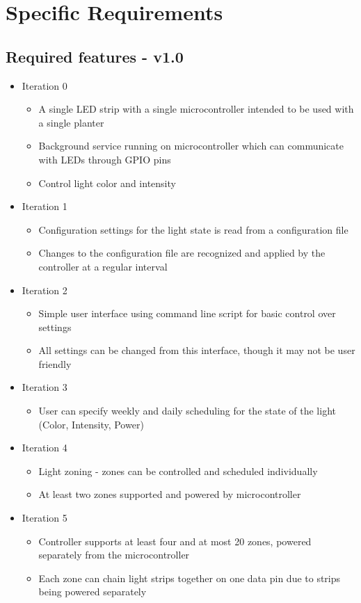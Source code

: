	\section{Specific Requirements}
		\subsection{Required features - v1.0}
			\begin{itemize}
				\item Iteration 0
						\begin{itemize}
						\item A single LED strip with a single microcontroller intended to be used with a single planter
						\item Background service running on microcontroller which can communicate with LEDs through GPIO pins
						\item Control light color and intensity
					\end{itemize}
						\item Iteration 1
					\begin{itemize}
						\item Configuration settings for the light state is read from a configuration file
						\item Changes to the configuration file are recognized and applied by the controller at a regular interval
					\end{itemize}

				\item Iteration 2
					\begin{itemize}
						\item Simple user interface using command line script for basic control over settings
						\item All settings can be changed from this interface, though it may not be user friendly
					\end{itemize}
				\item Iteration 3
					\begin{itemize}
						\item User can specify weekly and daily scheduling for the state of the light (Color, Intensity, Power)
					\end{itemize}
				\item Iteration 4
					\begin{itemize}
						\item Light zoning - zones can be controlled and scheduled individually
						\item At least two zones supported and powered by microcontroller
					\end{itemize}
				\item Iteration 5
					\begin{itemize}
						\item Controller supports at least four and at most 20 zones, powered separately from the microcontroller
						\item Each zone can chain light strips together on one data pin due to strips being powered separately
					\end{itemize}
			\end{itemize}

